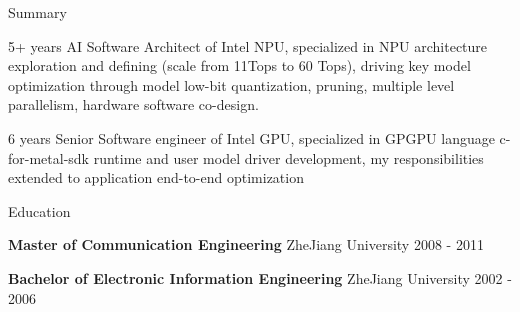 \documentclass{resume} %
\begin{document}
\begin{rSection}{Summary}

{5+ years AI Software Architect of Intel NPU, specialized in NPU architecture exploration and defining (scale from 11Tops to 60 Tops), driving key model optimization through model low-bit quantization, pruning, multiple level parallelism, hardware software co-design.}

{6 years Senior Software engineer of Intel GPU, specialized in GPGPU language c-for-metal-sdk runtime and user model driver development, my responsibilities extended to application end-to-end optimization}

\end{rSection}


\begin{rSection}{Education}

{\textbf{Master of Communication Engineering} \hfill ZheJiang University  {2008 - 2011}}

{\textbf{Bachelor of Electronic Information Engineering} \hfill ZheJiang University  {2002 - 2006}}

\end{rSection}
\end{document}
